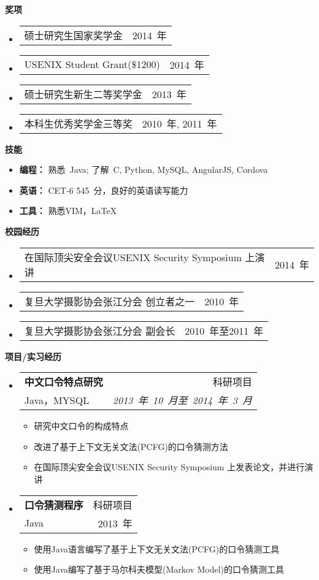 \documentclass[letterpaper,10pt]{article}
\makeatletter
\newcommand{\resitem}[1]{\item #1 \vspace{-2pt}}
\newcommand{\resheading}[1]{{\large \colorbox{mygrey}{\begin{minipage}{\textwidth}{\textbf{#1 \vphantom{p\^{E}}}}\end{minipage}}}}
\newcommand{\ressubheading}[4]{
\begin{tabular*}{6.5in}{l@{\extracolsep{\fill}}r}
		\textbf{#1} & #2 \\
		#3 & #4 \\
\end{tabular*}\vspace{-6pt}}
\newcommand{\cvitem}[2]{
\begin{tabular*}{6.5in}{l@{\extracolsep{\fill}}r}
		#1 & #2 \\
\end{tabular*}\vspace{-1pt}}
\makeatother
\begin{document}
\resheading{奖项}
	\begin{itemize}
		\item \cvitem{硕士研究生国家奖学金}{2014~年}
		\item \cvitem{USENIX Student Grant(\$1200)}{2014~年}
		\item \cvitem{硕士研究生新生二等奖学金}{2013~年}
		\item \cvitem{本科生优秀奖学金三等奖}{2010~年, 2011~年}
	\end{itemize}


\resheading{{技能}}
	\begin{itemize}
		\item
            \textbf{编程：} 熟悉~Java; 了解~C, Python, MySQL, AngularJS, Cordova %
        \item
            \textbf{英语：} CET-6 545~分，良好的英语读写能力
        \item 
        	\textbf{工具：} 熟悉VIM，\LaTeX
	\end{itemize} %


\resheading{校园经历}
\begin{itemize}
	\item \cvitem{在国际顶尖安全会议USENIX Security Symposium 上演讲}{2014~年}
	\item \cvitem{复旦大学摄影协会张江分会 创立者之一}{2010~年}
	\item \cvitem{复旦大学摄影协会张江分会 副会长}{2010~年至2011~年}
\end{itemize}

\resheading{项目/实习经历}
	\begin{itemize}
		\item
			\ressubheading{中文口令特点研究}{科研项目}{Java，MYSQL}{\emph{2013~年~10~月至~2014~年~3~月}}
			{\begin{itemize}
				\resitem{研究中文口令的构成特点}
                \resitem{改进了基于上下文无关文法(PCFG)的口令猜测方法}
				\resitem{在国际顶尖安全会议USENIX Security Symposium 上发表论文，并进行演讲}
			\end{itemize}
			}	
	\end{itemize}
	\begin{itemize}
		\item 
			\ressubheading{口令猜测程序}{科研项目}{Java}{2013~年}
			{\begin{itemize}
				\resitem{使用Java语言编写了基于上下文无关文法(PCFG)的口令猜测工具}
				\resitem{使用Java编写了基于马尔科夫模型(Markov Model)的口令猜测工具}
			\end{itemize}
			}
	\end{itemize}
\end{document}
